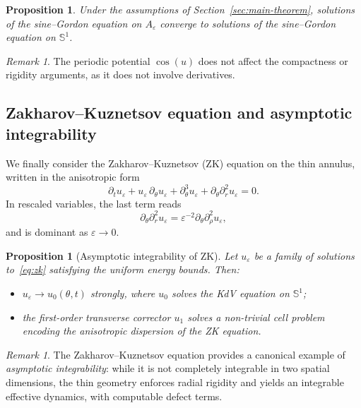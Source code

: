\documentclass[11pt]{amsart}
\theoremstyle{plain}
\newtheorem{proposition}[theorem]{Proposition}
\theoremstyle{definition}
\theoremstyle{remark}
\newtheorem{remark}[theorem]{Remark}
\theoremstyle{remark}
\begin{document}
\begin{proposition}
Under the assumptions of Section~\ref{sec:main-theorem}, solutions of the
sine--Gordon equation on $A_\varepsilon$ converge to solutions of the
sine--Gordon equation on $\mathbb S^1$.
\end{proposition}

\begin{remark}
The periodic potential $\cos(u)$ does not affect the compactness or rigidity
arguments, as it does not involve derivatives.
\end{remark}

\subsection{Zakharov--Kuznetsov equation and asymptotic integrability}

We finally consider the Zakharov--Kuznetsov (ZK) equation on the thin annulus,
written in the anisotropic form
\begin{equation}
\label{eq:zk}
\partial_t u_\varepsilon
+
u_\varepsilon\,\partial_\theta u_\varepsilon
+
\partial_\theta^3 u_\varepsilon
+
\partial_\theta\partial_r^2 u_\varepsilon
=0.
\end{equation}
In rescaled variables, the last term reads
\[
\partial_\theta\partial_r^2 u_\varepsilon
=
\varepsilon^{-2}\partial_\theta\partial_\rho^2 u_\varepsilon,
\]
and is dominant as $\varepsilon\to0$.

\begin{proposition}[Asymptotic integrability of ZK]
Let $u_\varepsilon$ be a family of solutions to~\eqref{eq:zk} satisfying the
uniform energy bounds.
Then:
\begin{itemize}
\item $u_\varepsilon\to u_0(\theta,t)$ strongly, where $u_0$ solves the KdV
equation on $\mathbb S^1$;
\item the first-order transverse corrector $u_1$ solves a non-trivial cell
problem encoding the anisotropic dispersion of the ZK equation.
\end{itemize}
\end{proposition}

\begin{remark}
The Zakharov--Kuznetsov equation provides a canonical example of
\emph{asymptotic integrability}:
while it is not completely integrable in two spatial dimensions, the thin
geometry enforces radial rigidity and yields an integrable effective dynamics,
with computable defect terms.
\end{remark}
\end{document}
